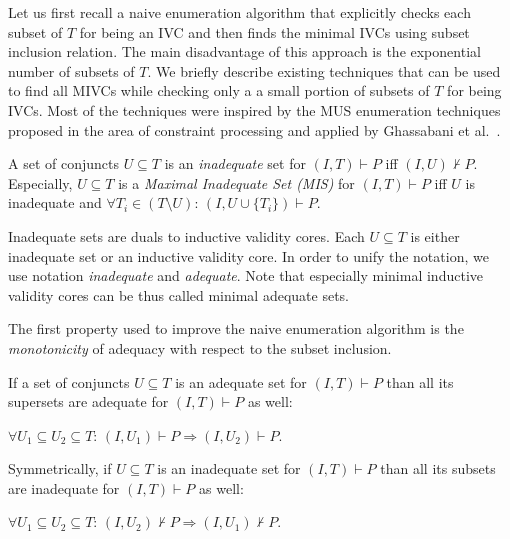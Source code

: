 \newcommand{\fUnex}{f_{\mathit{Unexplored}}}
Let us first recall 
a naive enumeration algorithm that   explicitly checks each subset of $T$ for being an IVC  and then finds the minimal IVCs  using subset inclusion relation. The main disadvantage of this approach is the   exponential number of subsets of $T$.
We briefly describe existing techniques that can be used to find all MIVCs while checking only a a small portion of subsets of $T$  for being IVCs.  Most of the techniques were inspired by the MUS enumeration techniques~\cite{}   proposed in the area of constraint processing and applied by Ghassabani et al.~\cite{}.






\begin{definition}[Inadequacy] A set of conjuncts  $U \subseteq T$  is an \emph{inadequate} set for $(I, T) \vdash P$ iff $(I, U) \nvdash P$. Especially, $U \subseteq T$ is a \emph{Maximal Inadequate Set (MIS)} for $(I, T) \vdash P$ iff $U$ is inadequate and $\forall T_i \in (T \setminus U): \, (I, U \cup \{ T_i\}) \vdash P$.
\end{definition}

Inadequate sets are duals to inductive validity cores. Each $U \subseteq T$ is either inadequate set or an inductive validity core. In order to unify the notation, we   use notation \emph{inadequate} and \emph{adequate}. Note that especially minimal inductive validity cores can be thus called  minimal adequate sets.  



The first property used to improve the naive enumeration algorithm is the \emph{monotonicity} of  adequacy   with respect to the subset inclusion.

\begin{lemma}[Monotonicity]
\label{lemma:monotonicity}
If a set of conjuncts  $U \subseteq T$  is an adequate set for $(I, T) \vdash P$   than all its supersets are adequate for  $(I, T) \vdash P$ as well:
\begin{center}
$\forall U_1 \subseteq U_2 \subseteq T: \, (I, U_1) \vdash P \Rightarrow (I, U_2) \vdash P$.
\end{center}
Symmetrically, if   $U \subseteq T$  is an inadequate set for $(I, T) \vdash P$   than all its subsets are inadequate for  $(I, T) \vdash P$ as well:
\begin{center}
$\forall U_1 \subseteq U_2 \subseteq T: \, (I, U_2) \nvdash P \Rightarrow (I, U_1) \nvdash P$.
\end{center}
\end{lemma}

